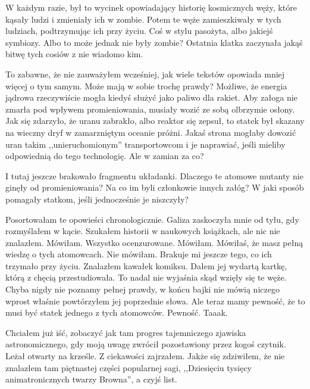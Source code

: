 W każdym razie, był to wycinek opowiadający historię kosmicznych węży, które kąsały ludzi i zmieniały ich w zombie.
Potem te węże zamieszkiwały w tych ludziach, podtrzymując ich przy życiu. Coś w stylu pasożyta, albo jakiejś symbiozy.
Albo to może jednak nie były zombie? 
Ostatnia klatka zaczynała jakąś bitwę tych cosiów z nie wiadomo kim.

To zabawne, że nie zauważyłem wcześniej, jak wiele tekstów  opowiada mniej więcej o tym samym. 
Może mają w sobie trochę prawdy?
Możliwe, że energia jądrowa rzeczywiście mogła kiedyś służyć jako paliwo dla rakiet.
Aby załoga nie zmarła pod wpływem promieniowania, musiały wozić ze sobą olbrzymie osłony.
Jak się zdarzyło, że uranu zabrakło, albo reaktor się zepsuł, to statek był skazany na wieczny dryf w zamarzniętym oceanie próżni.
Jakaś strona mogłaby dowozić uran takim ,,unieruchomionym'' transportowcom i je naprawiać, jeśli mieliby odpowiednią do tego technologię.
Ale w zamian za co?

I tutaj jeszcze brakowało fragmentu układanki. Dlaczego te atomowe mutanty nie ginęły od promieniowania? Na co im byli członkowie innych załóg?
W jaki sposób pomagały statkom, jeśli jednocześnie je niszczyły?

\begin{dialogue}
	\ds{} Posortowałam te opowieści chronologicznie. \dm{} Galiza zaskoczyła mnie od tyłu, gdy rozmyślałem w kącie.
	\ds{} Szukałem historii w naukowych książkach, ale nic nie znalazłem.
	\ds{} Mówiłam.
	\ds{} Wszystko ocenzurowane.
	\ds{} Mówiłam.
	\ds{} Mówiłaś, że masz pełną wiedzę o tych atomowcach.
	\ds{} Nie mówiłam. Brakuje mi jeszcze tego, co ich trzymało przy życiu.
	\ds{} Znalazłem kawałek komiksu. \dm{} Dałem jej wydartą kartkę, którą z chęcią przestudiowała.
	\ds{} To nadal nie wyjaśnia skąd wzięły się te węże.
	\ds{} Chyba nigdy nie poznamy pełnej prawdy, w końcu bajki nie mówią niczego wprost \dm{} właśnie powtórzyłem jej poprzednie słowa.
	\ds{} Ale teraz mamy pewność, że to musi być statek jednego z tych atomowców.
	\ds{} Pewność. Taaak.
\end{dialogue}

Chciałem już iść, zobaczyć jak tam progres tajemniczego zjawiska astronomicznego, gdy moją uwagę zwrócił pozostawiony przez kogoś czytnik.
Leżał otwarty na krześle.
Z ciekawości zajrzałem.
Jakże się zdziwiłem, że nie znalazłem tam piętnastej części popularnej sagi, ,,Dziesięciu tysięcy animatronicznych twarzy Browna'', a czyjś list.

